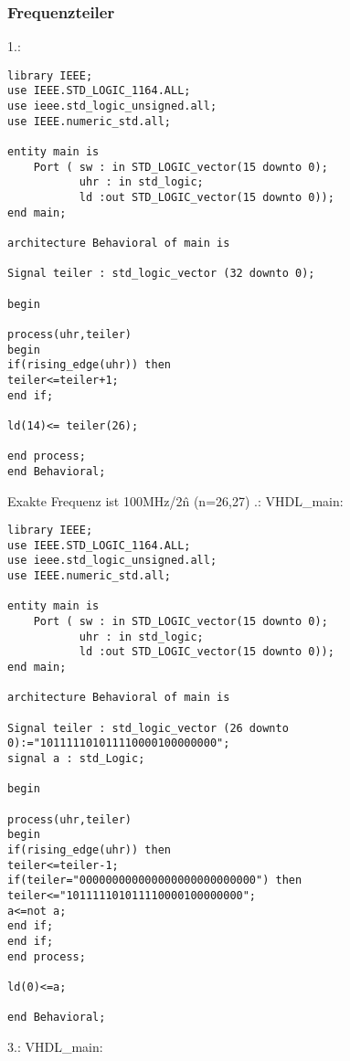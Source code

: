 \documentclass{article}
\begin{document}
\subsubsection{Frequenzteiler}
1.:\newline
\begin{verbatim}
library IEEE;
use IEEE.STD_LOGIC_1164.ALL;
use ieee.std_logic_unsigned.all;
use IEEE.numeric_std.all;

entity main is
    Port ( sw : in STD_LOGIC_vector(15 downto 0);
           uhr : in std_logic;
           ld :out STD_LOGIC_vector(15 downto 0));
end main;

architecture Behavioral of main is

Signal teiler : std_logic_vector (32 downto 0);

begin

process(uhr,teiler)
begin
if(rising_edge(uhr)) then
teiler<=teiler+1;
end if;

ld(14)<= teiler(26);

end process;
end Behavioral;

\end{verbatim}
Exakte Frequenz ist 100MHz/2\^{n} (n=26,27) .: \newline
VHDL\_main:\newline
\begin{verbatim}
library IEEE;
use IEEE.STD_LOGIC_1164.ALL;
use ieee.std_logic_unsigned.all;
use IEEE.numeric_std.all;

entity main is
    Port ( sw : in STD_LOGIC_vector(15 downto 0);
           uhr : in std_logic;
           ld :out STD_LOGIC_vector(15 downto 0));
end main;

architecture Behavioral of main is

Signal teiler : std_logic_vector (26 downto 0):="101111101011110000100000000";
signal a : std_Logic;

begin

process(uhr,teiler)
begin
if(rising_edge(uhr)) then
teiler<=teiler-1;
if(teiler="000000000000000000000000000") then
teiler<="101111101011110000100000000";
a<=not a;
end if;
end if;
end process;

ld(0)<=a;

end Behavioral;
\end{verbatim}
3.: \newline
VHDL\_main:\newline
\end{document}
